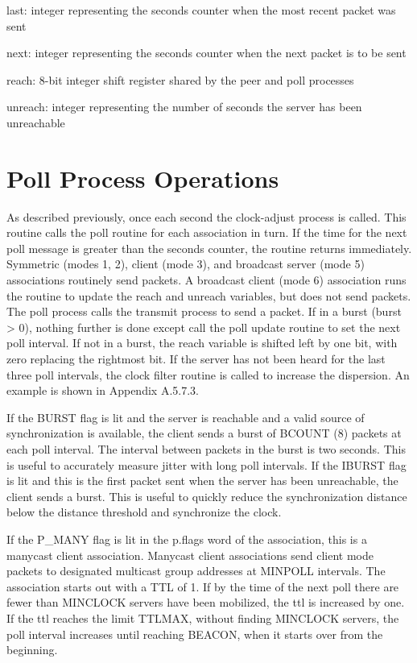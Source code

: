 last: integer representing the seconds counter when the most recent
packet was sent

next: integer representing the seconds counter when the next packet
is to be sent

reach: 8-bit integer shift register shared by the peer and poll
processes

unreach: integer representing the number of seconds the server has
been unreachable

\section{Poll Process Operations}

As described previously, once each second the clock-adjust process is
called.  This routine calls the poll routine for each association in
turn.  If the time for the next poll message is greater than the
seconds counter, the routine returns immediately.  Symmetric (modes
1, 2), client (mode 3), and broadcast server (mode 5) associations
routinely send packets.  A broadcast client (mode 6) association runs
the routine to update the reach and unreach variables, but does not
send packets.  The poll process calls the transmit process to send a
packet.  If in a burst (burst > 0), nothing further is done except
call the poll update routine to set the next poll interval.
  If not in a burst, the reach variable is shifted left by one bit,
with zero replacing the rightmost bit.  If the server has not been
heard for the last three poll intervals, the clock filter routine is
called to increase the dispersion.  An example is shown in
Appendix A.5.7.3.

If the BURST flag is lit and the server is reachable and a valid
source of synchronization is available, the client sends a burst of
BCOUNT (8) packets at each poll interval.  The interval between
packets in the burst is two seconds.  This is useful to accurately
measure jitter with long poll intervals.  If the IBURST flag is lit
and this is the first packet sent when the server has been
unreachable, the client sends a burst.  This is useful to quickly
reduce the synchronization distance below the distance threshold and
synchronize the clock.

If the P\_MANY flag is lit in the p.flags word of the association,
this is a manycast client association.  Manycast client associations
send client mode packets to designated multicast group addresses at
MINPOLL intervals.  The association starts out with a TTL of 1.  If
by the time of the next poll there are fewer than MINCLOCK servers
have been mobilized, the ttl is increased by one.  If the ttl reaches
the limit TTLMAX, without finding MINCLOCK servers, the poll interval
increases until reaching BEACON, when it starts over from the
beginning.


